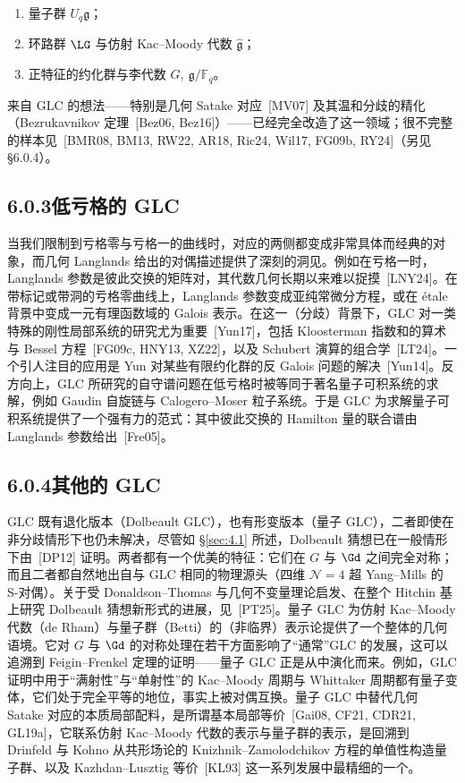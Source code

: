 \begin{enumerate}
\item 量子群 $U_{q}\mathfrak{g}$；
\item 环路群 $\LG$ 与仿射 Kac–Moody 代数 $\widehat{\mathfrak{g}}$；
\item 正特征的约化群与李代数 $G,\ \mathfrak{g}/\mathbb{F}_{q}$。
\end{enumerate}

来自 GLC 的想法——特别是几何 Satake 对应~[MV07] 及其温和分歧的精化（Bezrukavnikov 定理~[Bez06, Bez16]）——已经完全改造了这一领域；很不完整的样本见~[BMR08, BM13, RW22, AR18, Ric24, Wil17, FG09b, RY24]（另见 \S6.0.4）。

\subsection*{6.0.3\quad 低亏格的 GLC}

当我们限制到亏格零与亏格一的曲线时，对应的两侧都变成非常具体而经典的对象，而几何 Langlands 给出的对偶描述提供了深刻的洞见。例如在亏格一时，Langlands 参数是彼此交换的矩阵对，其代数几何长期以来难以捉摸~[LNY24]。在带标记或带洞的亏格零曲线上，Langlands 参数变成亚纯常微分方程，或在 étale 背景中变成一元有理函数域的 Galois 表示。在这一（分歧）背景下，GLC 对一类特殊的刚性局部系统的研究尤为重要~[Yun17]，包括 Kloosterman 指数和的算术与 Bessel 方程~[FG09c, HNY13, XZ22]，以及 Schubert 演算的组合学~[LT24]。一个引人注目的应用是 Yun 对某些有限约化群的反 Galois 问题的解决~[Yun14]。反方向上，GLC 所研究的自守谱问题在低亏格时被等同于著名量子可积系统的求解，例如 Gaudin 自旋链与 Calogero–Moser 粒子系统。于是 GLC 为求解量子可积系统提供了一个强有力的范式：其中彼此交换的 Hamilton 量的联合谱由 Langlands 参数给出~[Fre05]。

\subsection*{6.0.4\quad 其他的 GLC}

GLC 既有退化版本（Dolbeault GLC），也有形变版本（量子 GLC），二者即使在非分歧情形下也仍未解决，尽管如 \S\ref{sec:4.1} 所述，Dolbeault 猜想已在一般情形下由~[DP12] 证明。两者都有一个优美的特征：它们在 $G$ 与 $\Gd$ 之间完全对称；而且二者都自然地出自与 GLC 相同的物理源头（四维 $\mathcal{N}=4$ 超 Yang–Mills 的 S-对偶）。关于受 Donaldson–Thomas 与几何不变量理论启发、在整个 Hitchin 基上研究 Dolbeault 猜想新形式的进展，见~[PT25]。量子 GLC 为仿射 Kac–Moody 代数（de Rham）与量子群（Betti）的（非临界）表示论提供了一个整体的几何语境。它对 $G$ 与 $\Gd$ 的对称处理在若干方面影响了“通常”GLC 的发展，这可以追溯到 Feigin–Frenkel 定理的证明——量子 GLC 正是从中演化而来。例如，GLC 证明中用于“满射性”与“单射性”的 Kac–Moody 周期与 Whittaker 周期都有量子变体，它们处于完全平等的地位，事实上被对偶互换。量子 GLC 中替代几何 Satake 对应的本质局部配料，是所谓基本局部等价~[Gai08, CF21, CDR21, GL19a]，它联系仿射 Kac–Moody 代数的表示与量子群的表示，是回溯到 Drinfeld 与 Kohno 从共形场论的 Knizhnik–Zamolodchikov 方程的单值性构造量子群、以及 Kazhdan–Lusztig 等价~[KL93] 这一系列发展中最精细的一个。

